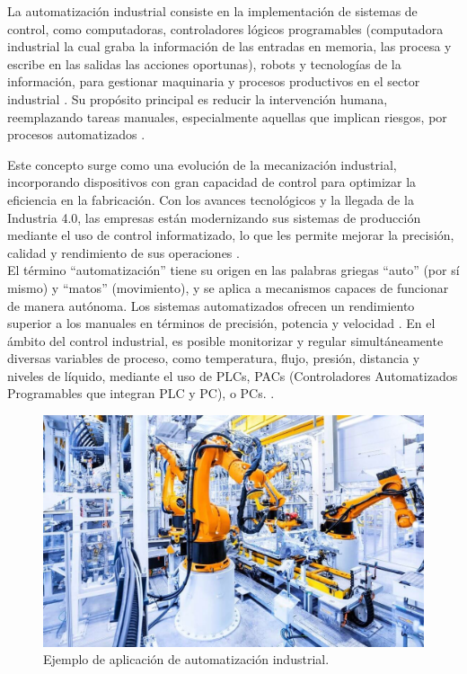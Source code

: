 La automatización industrial consiste en la implementación de sistemas de control, como computadoras, controladores lógicos programables (computadora industrial la cual graba la información de las entradas en memoria, las procesa y escribe en las salidas las acciones oportunas), robots y tecnologías de la información, para gestionar maquinaria y procesos productivos en el sector industrial \cite{definicion}. Su propósito principal es reducir la intervención humana, reemplazando tareas manuales, especialmente aquellas que implican riesgos, por procesos automatizados .

Este concepto surge como una evolución de la mecanización industrial, incorporando dispositivos con gran capacidad de control para optimizar la eficiencia en la fabricación. Con los avances tecnológicos y la llegada de la Industria 4.0, las empresas están modernizando sus sistemas de producción mediante el uso de control informatizado, lo que les permite mejorar la precisión, calidad y rendimiento de sus operaciones \cite{definicion}. \\

El término ``automatización'' tiene su origen en las palabras griegas ``auto'' (por sí mismo) y ``matos'' (movimiento), y se aplica a mecanismos capaces de funcionar de manera autónoma. Los sistemas automatizados ofrecen un rendimiento superior a los manuales en términos de precisión, potencia y velocidad \cite{definicion}. En el ámbito del control industrial, es posible monitorizar y regular simultáneamente diversas variables de proceso, como temperatura, flujo, presión, distancia y niveles de líquido, mediante el uso de PLCs, PACs (Controladores Automatizados Programables que integran PLC y PC), o PCs. \cite{definicion}. \\

\begin{figure} [h!]
  \begin{center}
    \includegraphics[width=13cm]{figs/automatizacion_industrial.jpg}
  \end{center}
  \caption{\centering Ejemplo de aplicación de automatización industrial.}
  \label{fig:automatizacion_industrial}
\end{figure}


